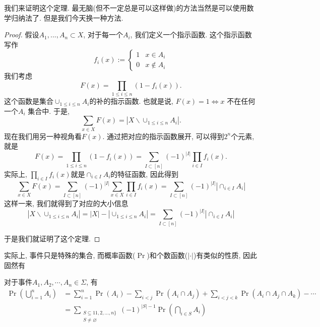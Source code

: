\documentclass{ctexart}
\begin{document}
我们来证明这个定理. 最无脑(但不一定总是可以这样做)的方法当然是可以使用数学归纳法了. 但是我们今天换一种方法. 

\begin{proof}
    假设$A_1, ..., A_n \subset X$, 对于每一个$A_i$, 我们定义一个指示函数. 这个指示函数写作 
    $$
    f_{i}(x):=\begin{cases}
1 & x\in A_{i}\\
0 & x\notin A_{i}
\end{cases}
$$
我们考虑
$$
F(x)=\prod_{1 \leq i \leq n}\left(1-f_i(x)\right) .
$$
这个函数是集合$\cup_{1 \leq i \leq n} A_i$的补的指示函数. 也就是说, $F(x)=1 \iff x$ 不在任何一个$A_i$ 集合中. 于是, 
$$
\sum_{x \in X} F(x)=\left|X \backslash \cup_{1 \leq i \leq n} A_i\right| .
$$
现在我们用另一种视角看$F(x)$. 通过把对应的指示函数展开, 可以得到$2^n$个元素, 就是
$$
F(x)=\prod_{1 \leq i \leq n}\left(1-f_i(x)\right)=\sum_{I \subset[n]}(-1)^{|I|} \prod_{i \in I} f_i(x) .
$$
实际上, $\prod_{i \in I} f_i(x)$就是$\cap_{i \in I} A_i$的特征函数, 因此得到
$$
\sum_{x \in X} F(x)=\sum_{I \subset[n]}(-1)^{|I|} \sum_{x \in X} \prod_{i \in I} f_i(x)=\sum_{I \subset[n]}(-1)^{|I|}\left|\cap_{i \in I} A_i\right|
$$
这样一来, 我们就得到了对应的大小信息
$$\left|X \backslash \cup_{1 \leq i \leq n} A_i\right|=|X|-\left|\cup_{1 \leq i \leq n} A_i\right|=\sum_{I \subset[n]}(-1)^{|I|}\left|\cap_{i \in I} A_i\right|$$

于是我们就证明了这个定理. 

\end{proof}

实际上, 事件只是特殊的集合, 而概率函数($\Pr$)和个数函数($|\cdot|$)有类似的性质, 因此固然有

对于事件$A_1, A_2, \cdots, A_n \in \Sigma$, 有
$$\begin{aligned} \operatorname{Pr}\left(\bigcup_{i=1}^n A_i\right) & =\sum_{i=1}^n \operatorname{Pr}\left(A_i\right)-\sum_{i<j} \operatorname{Pr}\left(A_i \cap A_j\right)+\sum_{i<j<k} \operatorname{Pr}\left(A_i \cap A_j \cap A_k\right)-\cdots \\ & =\sum_{\substack{S \subseteq 11,2, \ldots, n\} \\ S \neq \varnothing}}(-1)^{|S|-1} \operatorname{Pr}\left(\bigcap_{i \in S} A_i\right)\end{aligned}$$
\end{document}
